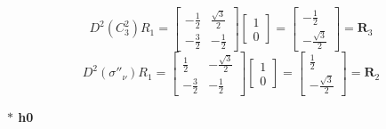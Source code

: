 \documentclass{report}
\begin{document}
\[
    \renewcommand{\arraystretch}{0.75}
    D^2\left(C_3^2\right)R_1 =
    \begin{bmatrix}
        -\frac{1}{2} & \frac{\sqrt{3}}{2} \\
        -\frac{3}{2} & -\frac{1}{2}
    \end{bmatrix}
    \begin{bmatrix}
        1 \\
        0
    \end{bmatrix}
    =
    \begin{bmatrix}
        -\frac{1}{2} \\
        -\frac{\sqrt{3}}{2}
    \end{bmatrix}
    = \textbf{R}_3
\]
\[
    \renewcommand{\arraystretch}{0.75}
    D^2\left(\sigma''_\nu\right)R_1 =
    \begin{bmatrix}
        \frac{1}{2}  & -\frac{\sqrt{3}}{2} \\
        -\frac{3}{2} & -\frac{1}{2}
    \end{bmatrix}
    \begin{bmatrix}
        1 \\
        0
    \end{bmatrix}
    =
    \begin{bmatrix}
        \frac{1}{2} \\
        -\frac{\sqrt{3}}{2}
    \end{bmatrix}
    = \textbf{R}_2
\]


\textbf{ $\ast$ h0}
\end{document}
